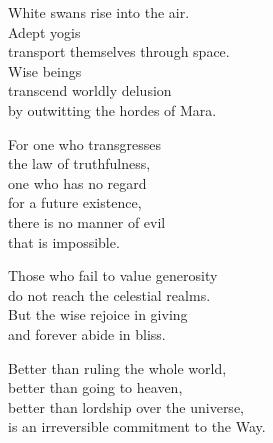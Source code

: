 White swans rise into the air.\\
Adept yogis\\
transport themselves through space.\\
Wise beings\\
transcend worldly delusion\\
by outwitting the hordes of Mara.


For one who transgresses\\
the law of truthfulness,\\
one who has no regard\\
for a future existence,\\
there is no manner of evil\\
that is impossible.


Those who fail to value generosity\\
do not reach the celestial realms.\\
But the wise rejoice in giving\\
and forever abide in bliss.


Better than ruling the whole world,\\
better than going to heaven,\\
better than lordship over the universe,\\
is an irreversible commitment to the Way.

